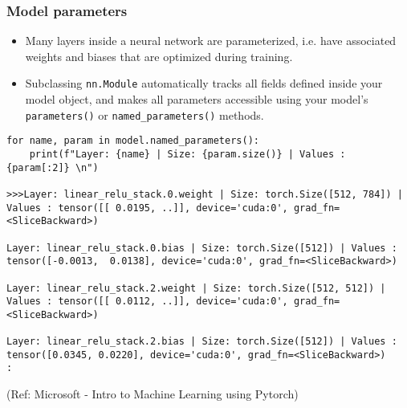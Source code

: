 \begin{frame}[fragile] \frametitle{Model parameters}

\begin{itemize}
\item Many layers inside a neural network are parameterized, i.e. have associated weights and biases that are optimized during training. 
\item  Subclassing \lstinline|nn.Module| automatically tracks all fields defined inside your model object, and makes all parameters accessible using your model's \lstinline|parameters()| or \lstinline|named_parameters()| methods.
\end{itemize}

\begin{lstlisting}
for name, param in model.named_parameters():
    print(f"Layer: {name} | Size: {param.size()} | Values : {param[:2]} \n")
		
>>>Layer: linear_relu_stack.0.weight | Size: torch.Size([512, 784]) | Values : tensor([[ 0.0195, ..]], device='cuda:0', grad_fn=<SliceBackward>) 

Layer: linear_relu_stack.0.bias | Size: torch.Size([512]) | Values : tensor([-0.0013,  0.0138], device='cuda:0', grad_fn=<SliceBackward>) 

Layer: linear_relu_stack.2.weight | Size: torch.Size([512, 512]) | Values : tensor([[ 0.0112, ..]], device='cuda:0', grad_fn=<SliceBackward>) 

Layer: linear_relu_stack.2.bias | Size: torch.Size([512]) | Values : tensor([0.0345, 0.0220], device='cuda:0', grad_fn=<SliceBackward>) 
:
\end{lstlisting}

\tiny{(Ref: Microsoft - Intro to Machine Learning using Pytorch)}
\end{frame}







